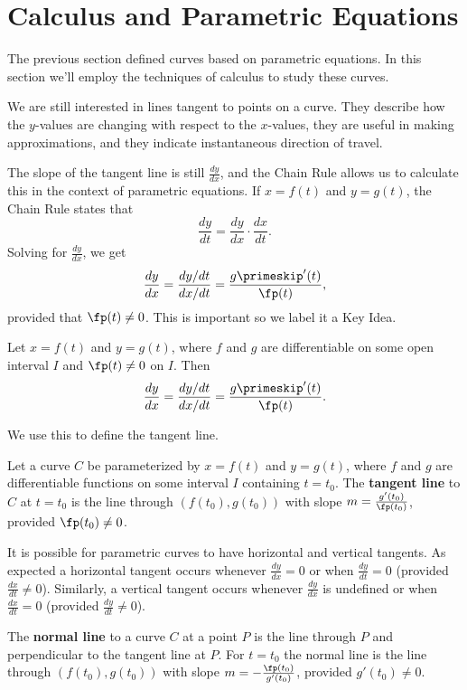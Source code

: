 \section{Calculus and Parametric Equations}\label{sec:par_calc}

The previous section defined curves based on parametric equations. In this section we'll employ the techniques of calculus to study these curves.

We are still interested in lines tangent to points on a curve. They describe how the $y$-values are changing with respect to the $x$-values, they are useful in making approximations, and they indicate instantaneous direction of travel.

The slope of the tangent line is still $\frac{dy}{dx}$, and the Chain Rule allows us to calculate this in the context of parametric equations. If $x=f(t)$ and $y=g(t)$, the Chain Rule states that
\[\frac{dy}{dt} = \frac{dy}{dx}\cdot\frac{dx}{dt}.\]
Solving for $\frac{dy}{dx}$, we get 
\[\frac{dy}{dx} = \frac{dy/dt}{dx/dt} = \frac{g\primeskip'(t)}{\fp(t)},\]
provided that $\fp(t)\neq 0$. This is important so we label it a Key Idea.

{Let $x=f(t)$ and $y=g(t)$, where $f$ and $g$ are differentiable on some open interval $I$ and $\fp(t)\neq 0$ on $I$. Then 
\[
\frac{dy}{dx}=\frac{dy/dt}{dx/dt}=\frac{g\primeskip'(t)}{\fp(t)}.
\]}

We use this to define the tangent line.

{Let a curve $C$ be parameterized by $x=f(t)$ and $y=g(t)$, where $f$ and $g$ are differentiable functions on some interval $I$ containing $t=t_0$. The 
\textbf{tangent line} to $C$ at $t=t_0$ is the line through $(f(t_0),g(t_0))$ with slope $m=\frac{g'(t_0)}{\fp(t_0)}$, provided $\fp(t_0) \neq 0$.}

It is possible for parametric curves to have horizontal and vertical tangents. As expected a horizontal tangent occurs whenever $\frac{dy}{dx} = 0$ or when $\frac{dy}{dt} = 0$ (provided $\frac{dx}{dt} \neq 0$). Similarly, a vertical tangent occurs whenever $\frac{dy}{dx}$ is undefined or when $\frac{dx}{dt} = 0$ (provided $\frac{dy}{dt} \neq 0$).

{The \textbf{normal line} to a curve $C$ at a point $P$ is the line through $P$ and perpendicular to the tangent line at $P$. For $t=t_0$ the normal line is the line through $(f(t_0), g(t_0))$ with slope $m=-\frac{\fp(t_0)}{g'(t_0)}$, provided $g'(t_0) \neq 0$.}

